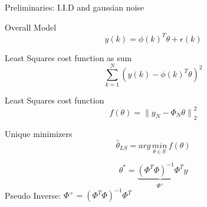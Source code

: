 
\begin{tcolorbox}[colback=red!5!white,colframe=red!75!black,title=\textbf{Linear Least Squares Estimation}]
Preliminaries: I.I.D and gaussian noise

Overall Model
\begin{equation*}
y(k)={ \phi (k) }^{ T }\theta +\epsilon (k)
\end{equation*}

Least Squares cost function as sum
\begin{equation*}
\sum _{ k=1 }^{ N }{{ (y(k)-{ \phi (k) }^{ T }\theta )}^{2  } } 
\end{equation*}

Least Squares cost function
\begin{equation*}
f(\theta )={ \parallel {y  }_{N  }-{ \Phi }_{ N }\theta\parallel }_{ 2 }^{2  }
\end{equation*}

Unique minimizers
\begin{equation*}
\hat{\theta}_{LS} =arg \, \underset{ \theta \in \mathbb{R} }{ min } \, f(\theta)
\end{equation*}

\begin{equation*}
{ \theta  }^{ * }=\underbrace { { ({ \Phi  }^{ T }\Phi ) }^{ -1 }{ \Phi  }^{ T } }_{ { \Phi  }^{ + } } y
\end{equation*}
Pseudo Inverse: \qquad $\Phi ^{ + }={({ \Phi  }^{ T }\Phi ) }^{ -1 }{ \Phi  }^{ T }$\\
\end{tcolorbox}

